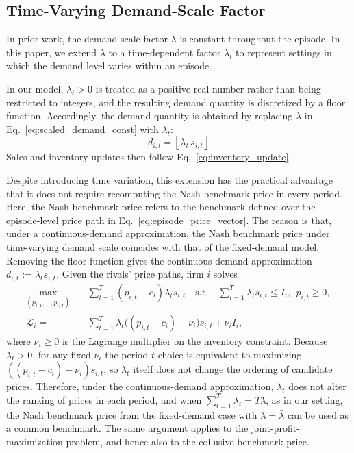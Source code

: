 \documentclass[runningheads]{llncs}
\begin{document}
\subsection{Time-Varying Demand-Scale Factor}
In prior work\cite{friedrich2025learning}, the demand-scale factor $\lambda$ is constant throughout the episode.
In this paper, we extend $\lambda$ to a time-dependent factor $\lambda_t$ to represent settings in which the demand level varies within an episode.

In our model, $\lambda_t>0$ is treated as a positive real number rather than being restricted to integers, and the resulting demand quantity is discretized by a floor function.
Accordingly, the demand quantity is obtained by replacing $\lambda$ in Eq.~\eqref{eq:scaled_demand_const} with $\lambda_t$:
\begin{equation}
d_{i,t}=\left\lfloor \lambda_t\, s_{i,t} \right\rfloor
\label{eq:scaled_demand}
\end{equation}
Sales and inventory updates then follow Eq.~\eqref{eq:inventory_update}.

Despite introducing time variation, this extension has the practical advantage that it does not require recomputing the Nash benchmark price in every period.
Here, the Nash benchmark price refers to the benchmark defined over the episode-level price path in Eq.~\eqref{eq:episode_price_vector}.
The reason is that, under a continuous-demand approximation, the Nash benchmark price under time-varying demand scale coincides with that of the fixed-demand model.
Removing the floor function gives the continuous-demand approximation $\tilde d_{i,t}:=\lambda_t s_{i,t}$. Given the rivals' price paths, firm $i$ solves
\begin{align}
\max_{(p_{i,1},\dots,p_{i,T})}\quad
&\sum_{t=1}^{T}(p_{i,t}-c_i)\lambda_t s_{i,t}
\quad
\text{s.t.}\quad
\sum_{t=1}^{T}\lambda_t s_{i,t}\le I_i,\ \ p_{i,t}\ge 0,
\label{eq:timevarying_lambda_relaxed_problem}\\
\mathcal{L}_i
=\;
&\sum_{t=1}^{T}\lambda_t\bigl((p_{i,t}-c_i)-\nu_i\bigr)s_{i,t}
+\nu_i I_i,
\label{eq:timevarying_lambda_lagrangian}
\end{align}
where $\nu_i\ge 0$ is the Lagrange multiplier on the inventory constraint. Because $\lambda_t>0$, for any fixed $\nu_i$ the period-$t$ choice is equivalent to maximizing $((p_{i,t}-c_i)-\nu_i)s_{i,t}$, so $\lambda_t$ itself does not change the ordering of candidate prices. Therefore, under the continuous-demand approximation, $\lambda_t$ does not alter the ranking of prices in each period, and when $\sum_{t=1}^{T}\lambda_t = T\bar{\lambda}$, as in our setting, the Nash benchmark price from the fixed-demand case with $\lambda=\bar{\lambda}$ can be used as a common benchmark.
The same argument applies to the joint-profit-maximization problem, and hence also to the collusive benchmark price.
\end{document}
